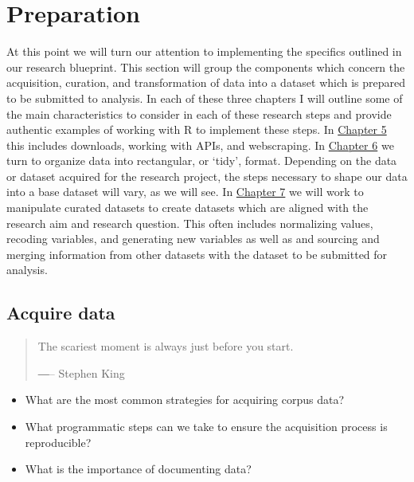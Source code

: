 \documentclass[
  letterpaper,
]{latex/krantz}
\providecommand{\tightlist}{%
  \setlength{\itemsep}{0pt}\setlength{\parskip}{0pt}}\usepackage{longtable,booktabs,array}
\begin{document}
\part{Preparation}

At this point we will turn our attention to implementing the specifics
outlined in our research blueprint. This section will group the
components which concern the acquisition, curation, and transformation
of data into a dataset which is prepared to be submitted to analysis. In
each of these three chapters I will outline some of the main
characteristics to consider in each of these research steps and provide
authentic examples of working with R to implement these steps. In
\protect\hyperlink{acquire-data}{Chapter 5} this includes downloads,
working with APIs, and webscraping. In
\protect\hyperlink{curate-data}{Chapter 6} we turn to organize data into
rectangular, or `tidy', format. Depending on the data or dataset
acquired for the research project, the steps necessary to shape our data
into a base dataset will vary, as we will see. In
\protect\hyperlink{transform-data}{Chapter 7} we will work to manipulate
curated datasets to create datasets which are aligned with the research
aim and research question. This often includes normalizing values,
recoding variables, and generating new variables as well as and sourcing
and merging information from other datasets with the dataset to be
submitted for analysis.

\hypertarget{sec-acquire-data}{%
\chapter{Acquire data}\label{sec-acquire-data}}

\begin{quote}
The scariest moment is always just before you start.

―-- Stephen King
\end{quote}

\begin{tcolorbox}[enhanced jigsaw, toprule=.15mm, bottomtitle=1mm, coltitle=black, title=\textcolor{quarto-callout-note-color}{\faInfo}\hspace{0.5em}{Keys}, left=2mm, colframe=quarto-callout-note-color-frame, bottomrule=.15mm, colbacktitle=quarto-callout-note-color!10!white, leftrule=.75mm, colback=white, titlerule=0mm, breakable, toptitle=1mm, opacityback=0, arc=.35mm, rightrule=.15mm, opacitybacktitle=0.6]

\begin{itemize}
\tightlist
\item
  What are the most common strategies for acquiring corpus data?
\item
  What programmatic steps can we take to ensure the acquisition process
  is reproducible?
\item
  What is the importance of documenting data?
\end{itemize}

\end{tcolorbox}
\end{document}
